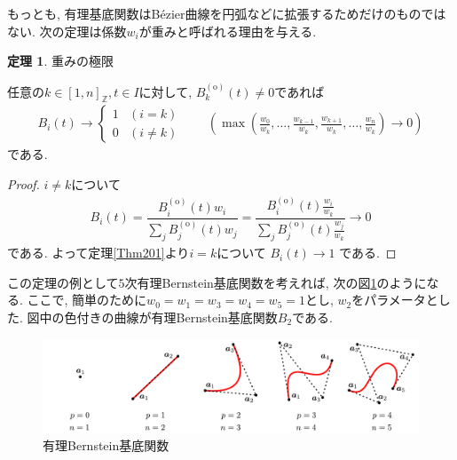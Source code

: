 \documentclass{jsarticle}
\newcommand\Pare[1]{\left(#1\right)}
\newcommand\squa[1]{[#1]}
\newcommand\Z[2]{\squa{#1,#2}_\mathbb{Z}}
\theoremstyle{definition}%
\newtheorem{thm}{定理}
\begin{document}
もっとも, 有理基底関数はB\'ezier曲線を円弧などに拡張するためだけのものではない.
次の定理は係数$w_i$が重みと呼ばれる理由を与える.
\begin{screen}
	\begin{thm}
		重みの極限

		任意の$k\in\Z{1}{n}, t\in I$に対して, $B_{k}^{(\text{o})}(t)\neq 0$であれば
		\begin{align}
			B_i(t)\to
			\begin{cases}
				1 &(i=k) \\
				0 &(i\neq k)
			\end{cases} \qquad
            \Pare{\max\Pare{\frac{w_0}{w_{k}},\dots,\frac{w_{{k}-1}}{w_{k}},\frac{w_{{k}+1}}{w_{k}},\dots,\frac{w_n}{w_{k}}}
			\to
			0}
		\end{align}
		である.
	\end{thm}
\end{screen}
\begin{proof}
	$i\neq k$について
	\begin{align}
		B_i(t)
		=
		\dfrac{B_{i}^{(\text{o})}(t)w_i}{\sum\limits_{j}B_{j}^{(\text{o})}(t)w_j}
		=
		\dfrac{B_{i}^{(\text{o})}(t)\frac{w_i}{w_{k}}}{\sum\limits_{j}B_{j}^{(\text{o})}(t)\frac{w_j}{w_{k}}}
		\to
		0
	\end{align}
	である.
	よって定理\ref{Thm201}より$i=k$について
	$B_i(t)\to 1$
    である.
\end{proof}
\newpage
この定理の例として$5$次有理Bernstein基底関数を考えれば, 次の図\ref{Fig212}のようになる.
ここで, 簡単のために$w_0=w_1=w_3=w_4=w_5=1$とし, $w_2$をパラメータとした.
図中の色付きの曲線が有理Bernstein基底関数$B_2$である.
\addtocounter{footnote}{-1}
\begin{figure}[htbp]
	\centering
    \includegraphics[page=6,clip,width=160mm]{fig.pdf}
	\caption{有理Bernstein基底関数\protect \footnotemark}
	\label{Fig212}
\end{figure}
\end{document}
